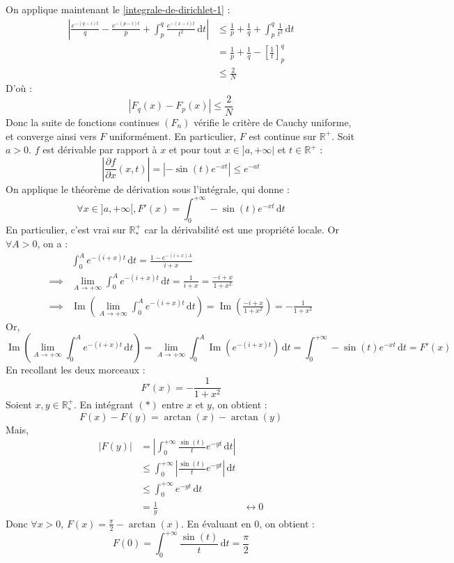 \begin{demonstration}
		On applique maintenant le \cref{integrale-de-dirichlet-1} :
		\begin{align*}
			\left| \frac{e^{-(q-i)t}}{q} - \frac{e^{-(p-i)t}}{p} +  \int_p^q \frac{e^{-(x-i)t}}{t^2} \, \mathrm{d}t \right| &\leq \frac{1}{p} + \frac{1}{q} + \int_p^q \frac{1}{t^2} \, \mathrm{d}t \\
			&= \frac{1}{p} + \frac{1}{q} - \left[ \frac{1}{t} \right]^q_p \\
			&\leq \frac{2}{N}
		\end{align*}
		D'où :
		\[ |F_q(x) - F_p(x)| \leq \frac{2}{N} \]
		Donc la suite de fonctions continues $(F_n)$ vérifie le critère de Cauchy uniforme, et converge ainsi vers $F$ uniformément. En particulier, $F$ est continue sur $\mathbb{R}^+$.
		\newpar
		Soit $a > 0$. $f$ est dérivable par rapport à $x$ et pour tout $x \in ]a, +\infty|$ et $t \in \mathbb{R}^+$ :
		\[ \left| \frac{\partial f}{\partial x} (x, t) \right| = |-\sin(t) e^{-xt}| \leq e^{-at} \]
		On applique le théorème de dérivation sous l'intégrale, qui donne :
		\[ \forall x \in ]a, +\infty[, F'(x) = \int_0^{+\infty} -\sin(t) e^{-xt} \, \mathrm{d}t \]
		En particulier, c'est vrai sur $\mathbb{R}^+_*$ car la dérivabilité est une propriété locale. Or $\forall A > 0$, on a :
		\begin{align*}
			& \int_0^A e^{-(i+x)t} \, \mathrm{d}t = \frac{1-e^{-(i+x)A}}{i+x} \\
			\implies & \lim_{A \rightarrow +\infty} \int_0^A e^{-(i+x)t} \, \mathrm{d}t = \frac{1}{i+x} = \frac{-i+x}{1 + x^2} \\
			\implies & \operatorname{Im} \left( \lim_{A \rightarrow +\infty} \int_0^A e^{-(i+x)t} \, \mathrm{d}t \right) = \operatorname{Im} \left( \frac{-i+x}{1 + x^2} \right) = -\frac{1}{1 + x^2}
		\end{align*}
		Or,
		\[ \operatorname{Im} \left( \lim_{A \rightarrow +\infty} \int_0^A e^{-(i+x)t} \, \mathrm{d}t \right) = \lim_{A \rightarrow +\infty} \int_0^A \operatorname{Im} \left( e^{-(i+x)t} \right) \, \mathrm{d}t = \int_0^{+\infty} -\sin(t) e^{-xt} \, \mathrm{d}t = F'(x) \]
		En recollant les deux morceaux :
		\[ F'(x) = -\frac{1}{1+x^2} \tag{$*$} \]
		\newpar
		Soient $x, y \in \mathbb{R}^+_*$. En intégrant $(*)$ entre $x$ et $y$, on obtient :
		\[ F(x) - F(y) = \arctan(x) - \arctan(y) \]
		Mais,
		\begin{align*}
			|F(y)| &= \left| \int_0^{+\infty} \frac{\sin(t)}{t} e^{-yt} \, \mathrm{d}t \right| \\
			&\leq \int_0^{+\infty} \left| \frac{\sin(t)}{t} e^{-yt} \right| \, \mathrm{d}t \\
			&\leq \int_0^{+\infty} e^{-yt} \, \mathrm{d}t \\
			&= \frac{1}{y}
			&\longleftrightarrow 0
		\end{align*}
		Donc $\forall x > 0$, $F(x) = \frac{\pi}{2} - \arctan(x)$. En évaluant en $0$, on obtient :
		\[ F(0) = \int_0^{+\infty} \frac{\sin(t)}{t} \, \mathrm{d}t = \frac{\pi}{2} \]
	\end{demonstration}

